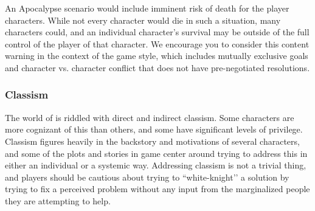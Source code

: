 \documentclass[sheet]{PP}
\begin{document}
An Apocalypse scenario would include imminent risk of death for the player characters. While not every character would die in such a situation, many characters could, and an individual character's survival may be outside of the full control of the player of that character. We encourage you to consider this content warning in the context of the game style, which includes mutually exclusive goals and character vs. character conflict that does not have pre-negotiated resolutions.

\subsubsection{Classism}
The world of \pEarth{} is riddled with direct and indirect classism. Some characters are more cognizant of this than others, and some have significant levels of privilege. Classism figures heavily in the backstory and motivations of several characters, and some of the plots and stories in game center around trying to address this in either an individual or a systemic way. Addressing classism is not a trivial thing, and players should be cautious about trying to ``white-knight'’ a solution by trying to fix a perceived problem without any input from the marginalized people they are attempting to help.
\end{document}
